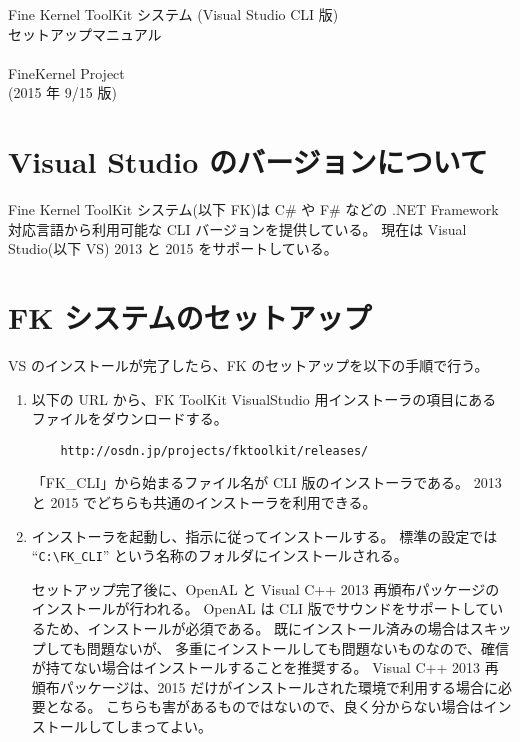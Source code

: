 \documentclass[a4j]{jarticle}
\begin{document}
\begin{center}
{\Large Fine Kernel ToolKit システム (Visual Studio CLI 版) \\
	セットアップマニュアル} \\ ~ \\
{\Large FineKernel Project} \\
(2015 年 9/15 版)
\end{center}


\section{Visual Studio のバージョンについて}
Fine Kernel ToolKit システム(以下 FK)は 
C\# や F\# などの .NET Framework 対応言語から利用可能な CLI バージョンを提供している。
現在は Visual Studio(以下 VS) 2013 と 2015 をサポートしている。

\section{FK システムのセットアップ}
VS のインストールが完了したら、FK のセットアップを以下の手順で行う。

\begin{enumerate}
\item 以下の URL から、FK ToolKit VisualStudio 用インストーラの項目にある
ファイルをダウンロードする。

\begin{verbatim}
    http://osdn.jp/projects/fktoolkit/releases/
\end{verbatim}

「FK\_CLI」から始まるファイル名が CLI 版のインストーラである。
2013 と 2015 でどちらも共通のインストーラを利用できる。

\item インストーラを起動し、指示に従ってインストールする。
標準の設定では ``\verb+C:\FK_CLI+'' という名称のフォルダにインストールされる。

セットアップ完了後に、OpenAL と Visual C++ 2013 再頒布パッケージのインストールが行われる。
OpenAL は CLI 版でサウンドをサポートしているため、インストールが必須である。
既にインストール済みの場合はスキップしても問題ないが、
多重にインストールしても問題ないものなので、確信が持てない場合はインストールすることを推奨する。
Visual C++ 2013 再頒布パッケージは、2015 だけがインストールされた環境で利用する場合に必要となる。
こちらも害があるものではないので、良く分からない場合はインストールしてしまってよい。

\end{enumerate}
\end{document}
